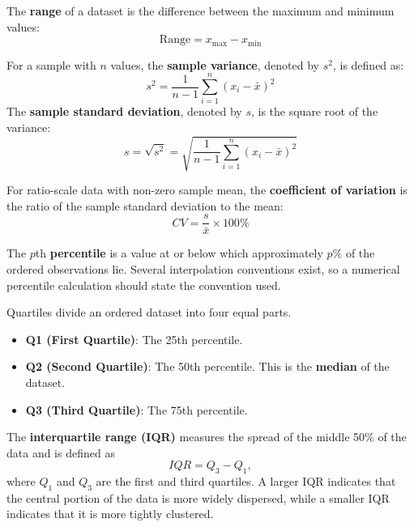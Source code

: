 \begin{definition}[Range]
The \textbf{range} of a dataset is the difference between the maximum and minimum values:
\[
\text{Range} = x_{\max} - x_{\min}
\]
\end{definition}

\begin{definition}
For a sample with $n$ values, the \textbf{sample variance}, denoted by $s^2$, is defined as:
$$
s^2 = \frac{1}{n-1}\sum_{i=1}^{n}(x_i - \bar{x})^2
$$
The \textbf{sample standard deviation}, denoted by $s$, is the square root of the variance:
$$
s = \sqrt{s^2} = \sqrt{\frac{1}{n-1}\sum_{i=1}^{n}(x_i - \bar{x})^2}
$$
\end{definition}

\begin{definition}
For ratio-scale data with non-zero sample mean, the \textbf{coefficient of variation} is the ratio of the sample standard deviation to the mean:
\[
CV = \frac{s}{\bar{x}} \times 100\%
\]
\end{definition}

\begin{definition}[Percentile]
The $p$th \textbf{percentile} is a value at or below which approximately $p\%$ of the ordered observations lie. Several interpolation conventions exist, so a numerical percentile calculation should state the convention used.
\end{definition}

\begin{definition}[Quartiles]

Quartiles divide an ordered dataset into four equal parts.

\begin{itemize}
    \item \textbf{Q1 (First Quartile)}: The 25th percentile.
    \item \textbf{Q2 (Second Quartile)}: The 50th percentile. This is the \textbf{median} of the dataset.
    \item \textbf{Q3 (Third Quartile)}: The 75th percentile.
\end{itemize}
\end{definition}

\begin{definition}
    The \textbf{interquartile range (IQR)} measures the spread of the middle 50\% of the data and is defined as
    $$
    IQR = Q_3 - Q_1,
    $$
    where $Q_1$ and $Q_3$ are the first and third quartiles. A larger IQR indicates that the central portion of the data is more widely dispersed, while a smaller IQR indicates that it is more tightly clustered.
\end{definition}

